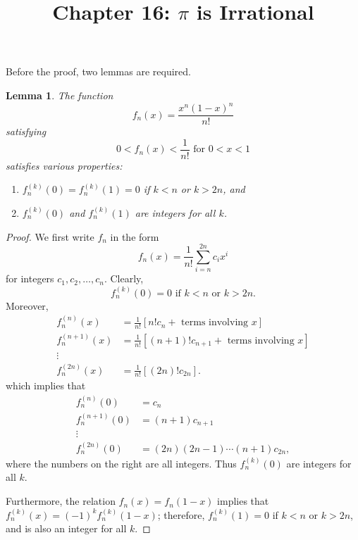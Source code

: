 \documentclass{article}
\newtheorem*{lemma*}{Lemma}
\begin{document}
\title{Chapter 16: $\pi$ is Irrational}
\maketitle

Before the proof, two lemmas are required.

\begin{lemma*}
  The function \[
    f_n(x) = \frac{x^n(1 - x)^n}{n!}
  \] satisfying \[
    0 < f_n(x) < \frac{1}{n!} \text{ for } 0 < x < 1
  \] satisfies various properties:
  \begin{enumerate}
    \item $f_n^{(k)}(0) = f_n^{(k)}(1) = 0$ if $k < n$ or $k > 2n$, and
    \item $f_n^{(k)}(0)$ and $f_n^{(k)}(1)$ are integers for all $k$.
  \end{enumerate}
\end{lemma*}
\begin{proof}
  We first write $f_n$ in the form \[
    f_n(x) = \frac{1}{n!}\sum_{i = n}^{2n} c_ix^i
  \] for integers $c_1, c_2, \ldots, c_n$. Clearly, \[
    f_n^{(k)}(0) = 0 \text{ if } k < n \text{ or } k > 2n.
  \] Moreover,
  \begin{align*}
    f_n^{(n)}(x) &= \frac{1}{n!}[n!c_n + \text{ terms involving } x] \\
    f_n^{(n+1)}(x) &= \frac{1}{n!}[(n+1)!c_{n+1} +
    \text{ terms involving } x] \\
    \vdots& \\
    f_n^{(2n)}(x) &= \frac{1}{n!}[(2n)!c_{2n}].
  \end{align*}
  which implies that
  \begin{align*}
    f_n^{(n)}(0) &= c_n \\
    f_n^{(n+1)}(0) &= (n+1)c_{n+1} \\
    \vdots& \\
    f_n^{(2n)}(0) &= (2n)(2n-1)\cdots(n+1)c_{2n},
  \end{align*}
  where the numbers on the right are all integers. Thus $f_n^{(k)}(0)$ are
  integers for all $k$.

  Furthermore, the relation $f_n(x) = f_n(1 - x)$ implies that $f_n^{(k)}(x) =
  (-1)^kf_n^{(k)}(1 - x)$; therefore, $f_n^{(k)}(1) = 0$ if $k < n$ or $k >
  2n$, and is also an integer for all $k$.
\end{proof}
\end{document}
